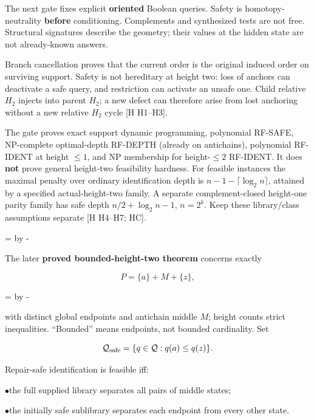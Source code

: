\documentclass[10pt,letterpaper]{article}
\newcommand{\NeedDisplaySpace}{\par\begingroup\dimen0=\pagegoal\advance\dimen0 by -\pagetotal\ifdim\dimen0<8\baselineskip\newpage\fi\endgroup}
\begin{document}
The next gate fixes explicit \textbf{oriented} Boolean queries. Safety is homotopy-neutrality \textbf{before} conditioning. Complements and synthesized tests are not free. Structural signatures describe the geometry; their values at the hidden state are not already-known answers.\par

Branch cancellation proves that the current order is the original induced order on surviving support. Safety is not hereditary at height two: loss of anchors can deactivate a safe query, and restriction can activate an unsafe one. Child relative \(H_2\) injects into parent \(H_2\); a new defect can therefore arise from lost anchoring without a new relative \(H_2\) cycle [H H1--H3].\par

The gate proves exact support dynamic programming, polynomial RF-SAFE, NP-complete optimal-depth RF-DEPTH (already on antichains), polynomial RF-IDENT at height \(\le1\), and NP membership for height-\(\le2\) RF-IDENT. It does \textbf{not} prove general height-two feasibility hardness. For feasible instances the maximal penalty over ordinary identification depth is \(n-1-\lceil\log_2n\rceil\), attained by a specified actual-height-two family. A separate complement-closed height-one parity family has safe depth \(n/2+\log_2n-1\), \(n=2^k\). Keep these library/class assumptions separate [H H4--H7; HC].\par

\NeedDisplaySpace
\begin{samepage}
The later \textbf{proved bounded-height-two theorem} concerns exactly\par
\[
P=\{a\}+M+\{z\},
\]
\end{samepage}
\NeedDisplaySpace
\begin{samepage}
with distinct global endpoints and antichain middle \(M\); height counts strict inequalities. ``Bounded'' means endpoints, not bounded cardinality. Set\par
\[
\mathcal Q_{\rm safe}=\{q\in\mathcal Q:q(a)\le q(z)\}.
\]
\end{samepage}
Repair-safe identification is feasible iff:\par

\noindent$\bullet$\quad the full supplied library separates all pairs of middle states;\par
\noindent$\bullet$\quad the initially safe sublibrary separates each endpoint from every other state.\par
\end{document}
